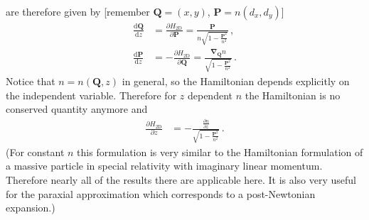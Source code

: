 \documentclass[12pt,a4paper,twoside,openright,BCOR10mm,headsepline,titlepage,abstracton,chapterprefix,final]{scrreprt}
\newcommand\Vector[1]{{\mathbf{#1}}}
\begin{document}
are therefore given by [remember $\Vector{Q} = (x,y)$, $\Vector{P} = n (d_x, d_y)$]
\begin{subequations}
\label{eq:H2Deom}
\begin{align}
 \frac{\text{d}\Vector{Q}}{\text{d}z} &= \frac{\partial H_{\text{2D}}}{\partial \Vector{P}} = \frac{\Vector{P}}{n \sqrt{1 - \frac{\Vector{P}^2}{n^2}}}\,,\\
 \frac{\text{d}\Vector{P}}{\text{d}z} &= -\frac{\partial H_{\text{2D}}}{\partial \Vector{Q}} = \frac{\Vector{\nabla}_{\Vector{Q}} n}{\sqrt{1 - \frac{\Vector{P}^2}{n^2}}}\,.    
\end{align}
\end{subequations}
Notice that $n = n(\Vector{Q}, z)$ in general, so the Hamiltonian depends explicitly on the independent variable.
Therefore for $z$ dependent $n$ the Hamiltonian is no conserved quantity anymore and
\begin{align}
 \frac{\partial H_{\text{2D}}}{\partial z} &= -\frac{\frac{\partial n}{\partial z}}{\sqrt{1 - \frac{\Vector{P}^2}{n^2}}}\,.
\end{align}
(For constant $n$ this formulation is very similar to the Hamiltonian formulation of a 
massive particle in special relativity with imaginary linear momentum.
Therefore nearly all of the results there are applicable here. It is also very useful 
for the paraxial approximation which corresponds to a post-Newtonian expansion.)
\end{document}
